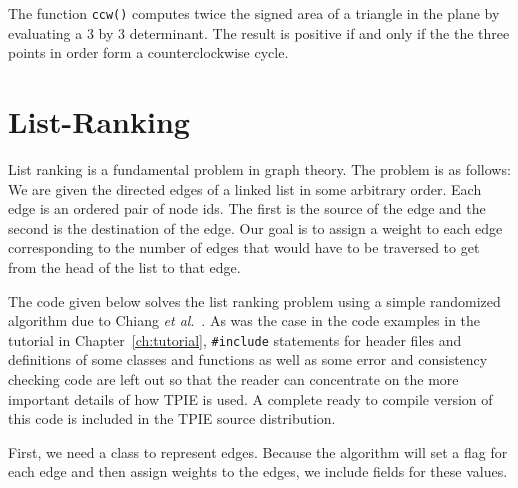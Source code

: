 

The function \lstinline|ccw()| computes twice the signed area of a triangle in
the plane by evaluating a 3 by 3 determinant.  The result is positive
if and only if the the three points in order form a counterclockwise
cycle.




\section{List-Ranking}
\label{sec:list-ranking}

List ranking is a fundamental problem in graph theory.  The problem is
as follows: We are given the directed edges of a linked list in some
arbitrary order.  Each edge is an ordered pair of node ids.  The first
is the source of the edge and the second is the destination of the
edge.  Our goal is to assign a weight to each edge corresponding to
the number of edges that would have to be traversed to get from the
head of the list to that edge.

The code given below solves the list ranking problem using a simple
randomized algorithm due to Chiang {\em et al}.~\cite{chiang:external}.
As was the case in the code examples in the tutorial in
Chapter~\ref{ch:tutorial}, \lstinline|#include| statements
for header files and definitions of some classes and functions as well
as some error and consistency checking code are left out so that the
reader can concentrate on the more important details of how TPIE is
used.  A complete ready to compile version of this code is included in
the TPIE source distribution.

First, we need a class to represent edges.  Because the algorithm will
set a flag for each edge and then assign weights to the edges, we
include fields for these values.



